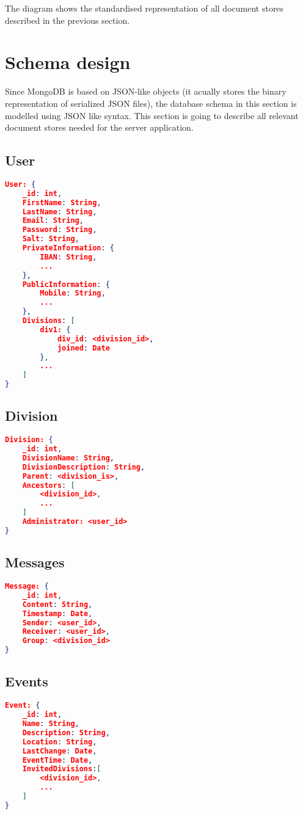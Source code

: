 The diagram shows the standardised representation of all document stores described in the previous section.

\section{Schema design}
Since MongoDB is based on JSON-like objects (it acually stores the binary representation of serialized JSON files), the database schema in this section is modelled using JSON like syntax. This section is going to describe all relevant document stores needed for the server application.

\subsection{User}
\begin{lstlisting}[language=json, caption=\emph{User}-document store]
User: {
    _id: int,  
    FirstName: String, 
    LastName: String, 
    Email: String,
    Password: String,
    Salt: String,
    PrivateInformation: {
        IBAN: String,
        ...
    },
    PublicInformation: {
        Mobile: String,
        ...
    },
    Divisions: [
        div1: {
            div_id: <division_id>,
            joined: Date
        },
        ...
    ]
}
\end{lstlisting}

\subsection{Division}
\begin{lstlisting}[language=json, caption=\emph{Division}-document store]
Division: {
    _id: int,  
    DivisionName: String,
    DivisionDescription: String,
    Parent: <division_is>,
    Ancestors: [
        <division_id>,
        ...
    ]
    Administrator: <user_id>
}
\end{lstlisting}

\subsection{Messages}
\begin{lstlisting}[language=json, caption=\emph{Message}-document store]
Message: {
    _id: int,  
    Content: String,
    Timestamp: Date,
    Sender: <user_id>,
    Receiver: <user_id>,
    Group: <division_id>
}
\end{lstlisting}

\subsection{Events}
\begin{lstlisting}[language=json, caption=\emph{Event}-document store]
Event: {
    _id: int,  
    Name: String,
    Description: String,
    Location: String,
    LastChange: Date,
    EventTime: Date,
    InvitedDivisions:[
        <division_id>,
        ...
    ]
}
\end{lstlisting}

